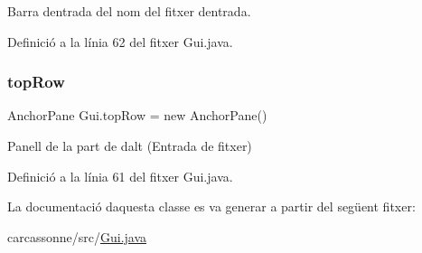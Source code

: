 Barra d\textquotesingle{}entrada del nom del fitxer d\textquotesingle{}entrada. 



Definició a la línia 62 del fitxer Gui.\+java.

\mbox{\label{class_gui_ab46ede23c79d98785ce4482e11c6f19e}} 
\subsubsection{\texorpdfstring{top\+Row}{topRow}}
{\footnotesize\ttfamily Anchor\+Pane Gui.\+top\+Row = new Anchor\+Pane()\hspace{0.3cm}{\ttfamily [private]}}



Panell de la part de dalt (Entrada de fitxer) 



Definició a la línia 61 del fitxer Gui.\+java.



La documentació d\textquotesingle{}aquesta classe es va generar a partir del següent fitxer\+:\begin{DoxyCompactItemize}
\item 
carcassonne/src/\mbox{\hyperlink{_gui_8java}{Gui.\+java}}\end{DoxyCompactItemize}
